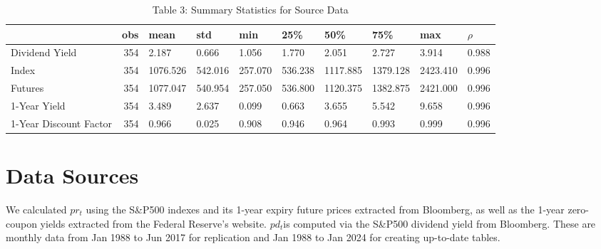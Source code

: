 \documentclass{article}
\begin{document}
\begin{table}[H]
\centering
\begin{tabular}{lrllllllll}
    \toprule
     & obs & mean & std & min & 25\% & 50\% & 75\% & max & $\rho$ \\
    \midrule
    Dividend Yield & 354 & 2.187 & 0.666 & 1.056 & 1.770 & 2.051 & 2.727 & 3.914 & 0.988 \\
    Index & 354 & 1076.526 & 542.016 & 257.070 & 536.238 & 1117.885 & 1379.128 & 2423.410 & 0.996 \\
    Futures & 354 & 1077.047 & 540.954 & 257.050 & 536.800 & 1120.375 & 1382.875 & 2421.000 & 0.996 \\
    1-Year Yield & 354 & 3.489 & 2.637 & 0.099 & 0.663 & 3.655 & 5.542 & 9.658 & 0.996 \\
    1-Year Discount Factor & 354 & 0.966 & 0.025 & 0.908 & 0.946 & 0.964 & 0.993 & 0.999 & 0.996 \\
    \bottomrule
\end{tabular}
\caption*{Table 3: Summary Statistics for Source Data}
\label{tab:your_label}
\end{table}    


\section{Data Sources}
We calculated \(pr_t\) using the S\&P500 indexes and its 1-year expiry 
future prices extracted from Bloomberg, as well as the 1-year zero-coupon 
yields extracted from the Federal Reserve’s website. \(pd_t \)is 
computed via the S\&P500 dividend yield from Bloomberg. These are 
monthly data from Jan 1988 to Jun 2017 for replication and Jan 1988 
to Jan 2024 for creating up-to-date tables.
\end{document}
